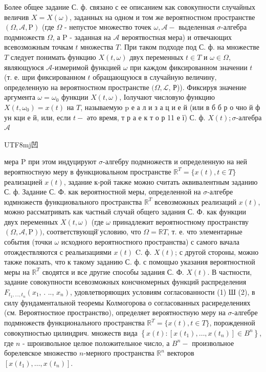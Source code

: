 \documentclass[10pt]{article}
\begin{document}
Более общее задание С. ф. связано с ее описанием как совокупности случайных величив $X=X(\omega)$, заданных на одном и том же вероятностном пространстве $(\Omega, \mathcal{A}, \mathrm{P})$ (где $\Omega$ - непустое множество точек $\omega, \mathcal{A}-$ выделенная $\sigma$-алгебра подмножеств $\Omega$, а P - заданная на $\mathcal{A}$ вероятвостная мера) и отвечающих всевозможным точкам $t$ множества $T$. При таком подходе под С. ф. на множестве $T$ следует понимать функцию $X(t, \omega)$ двух переменных $t \in T$ и $\omega \in \Omega$, являющуюся $\mathcal{A}$-измеримой функцией $\omega$ при каждом фиксированном значении $t$ (т. е. шри фиксированном $t$ обращающуюся в случайную величину, определенную на вероятностном пространстве $(\Omega, \mathcal{L}$, Р)). Фиксируя значение аргумента $\omega=\omega_{0}$ функции $X(t, \omega)$, Іолучают числовую функцию $X\left(t, \omega_{0}\right)=x(t)$ на $T$, называемую $\mathrm{p}$ е а л и з а ц и е й (или в б б р о чно й ф ун кци е й, или, если $t-$ әто время, т р а е к т о р 11 е ї) С. ф. $X(t) ; \sigma$-алгебра $\mathcal{A}$ \begin{CJK}{UTF8}{mj}凹\end{CJK} мера $\mathrm{P}$ при этом индуцируют $\sigma$-алгебру подмножеств и определенную на ней вероятностную меру в функциовальном пространстве $\mathbb{R}^{T}=\{x(t), t \in T\}$ реализацией $x(t)$, задание к-рой также можно считать әквивалентным заданию С. ф. Задание С. Ф. как вероятностной меры, определенной на $\sigma$-алгебре юдмножеств функциовального пространства $\mathbb{R}^{T}$ всевозможных реализаций $x(t)$, можно рассматривать как частный случай общего задания С. Ф. как функции двух переменных $X(t, \omega)$ (где $\omega$ принадлежит вероятностному пространству $(\Omega, \mathcal{A}, \mathrm{P}))$, соответствующй̈ условию, что $\Omega=\mathbb{R} T$, т. е. что элементарные события (точки $\omega$ исходного вероятностного пространства) с самого вачала отождествляются с реальизациями $x(t)$ C. ф. $X(t)$; с другой стороны, можно также показать, что к такому заданию С. ф. с помощыо указания вероятностной меры на $\mathbb{R}^{T}$ сводятся и все другие способы задания С. Ф. $X(t)$. В частности, задание совокупности всевозможных консчномерных функций распределения $F_{t_{1}, \ldots, t_{n}}\left(x_{1}\right.$, . .., $\left.x_{n}\right)$, удовлетворяющих условиям согласованности (1) Ш (2), в силу фундаментальной теоремы Колмогорова о согласованных расиределениях (см. Вероятностиое пространство), определяет вероятностную меру на $\sigma$-алгебре подмножеств функционального пространства $\mathbb{R}^{T}=\{x(t), t \in T\}$, порожденной совокупностью цилиндрич. множеств вида $\left\{x(t):\left[x\left(t_{1}\right), \ldots, x\left(t_{n}\right)\right] \in B^{n}\right\}$, где $n$ - шроизвольное целюе положительное число, а $B^{n}-$ произвольное борелевское множество $n$-мерного пространства $\mathbb{R}^{n}$ векторов $\left[x\left(t_{1}\right), \ldots, x\left(t_{n}\right)\right]$.
\end{document}
